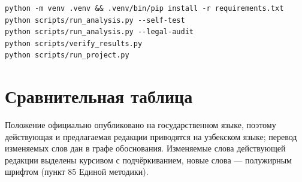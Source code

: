 \documentclass[14pt,a4paper]{extarticle}
\begin{document}
\begingroup\fontsize{11bp}{13.2bp}\selectfont
\begin{verbatim}
python -m venv .venv && .venv/bin/pip install -r requirements.txt
python scripts/run_analysis.py --self-test
python scripts/run_analysis.py --legal-audit
python scripts/verify_results.py
python scripts/run_project.py
\end{verbatim}
\endgroup

\section{Сравнительная таблица}\label{sec:cmp}
Положение официально опубликовано на государственном языке, поэтому действующая и предлагаемая редакции приводятся на узбекском языке; перевод изменяемых слов дан в графе обоснования. Изменяемые слова действующей редакции выделены курсивом с подчёркиванием, новые слова — полужирным шрифтом (пункт 85 Единой методики).
\end{document}
